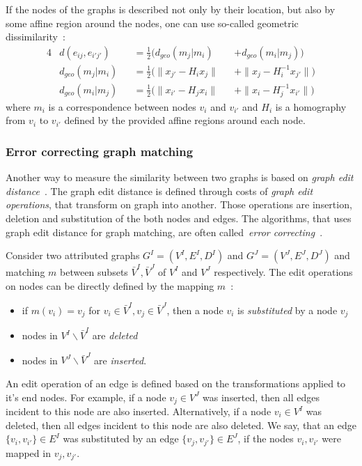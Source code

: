 \begin{itemize}
	If the nodes of the graphs is described not only by their location, but also by some affine region around the nodes, one can use so-called geometric dissimilarity~\cite{Cho2009_AgglClustering,Cho2012_ProgressiveGM}:
	\begin{alignat}{4}\label{eq:geomDiss}
	& d(e_{ij},e_{i'j'}) && =\frac{1}{2}(d_{geo}(m_j|m_i) && +d_{geo}(m_i|m_j)) \\
	& d_{geo}(m_j|m_i) && =\frac{1}{2}(\|x_{j'}-H_{i}x_j\| && + \|x_{j}-H^{-1}_ix_{j'}\|) \\
	& d_{geo}(m_i|m_j) && =\frac{1}{2}(\|x_{i'}-H_{j}x_i\| && + \|x_{i}-H^{-1}_{j}x_{i'}\|) 
	\end{alignat}
	where $m_i$ is a correspondence between nodes $v_i$ and $v_{i'}$ and $H_i$ is a homography from $v_i$ to $v_{i'}$ defined by the provided affine regions around each node.
\end{itemize}
\vspace{-5pt}

\subsubsection{Error correcting graph matching}
Another way to measure the similarity between two graphs is based on \emph{graph edit distance}~\cite{Bunke1983_inexactGM}. The graph edit distance is defined through costs of \emph{graph edit operations}, that transform on graph into another. Those operations are insertion, deletion and substitution of the both nodes and edges. The algorithms, that uses graph edit distance for graph matching, are often called~\emph{error correcting}~\cite{Conte2004}.

Consider two attributed graphs $G^I = (V^I, E^I,D^I)$ and $G^J = (V^J, E^J,D^J)$ and matching $m$ between subsets $\bar{V}^I,\bar{V}^J$ of $V^I$ and $V^J$ respectively. The edit operations on nodes can be directly defined by the mapping $m$~\cite{Bunke1998_ErrTolerantGM}:
\begin{itemize}
	\item if $m(v_i)=v_j$ for $v_i\in\bar{V}^I,v_j\in\bar{V}^J$, then a node $v_i$ is \emph{substituted} by a node $v_j$
	\item nodes in $V^I\backslash\bar{V}^I$ are \emph{deleted}
	\item nodes in $V^J\backslash\bar{V}^J$ are \emph{inserted}.
\end{itemize}
An edit operation of an edge is defined based on the transformations applied to it's end nodes. For example, if a node $v_j\in V^J$ was inserted, then all edges incident to this node are also inserted. Alternatively, if a node $v_i\in V^I$ was deleted, then all edges incident to this node are also deleted. We say, that an edge $\{v_i,v_{i'}\}\in E^I$ was substituted by an edge $\{v_j,v_{j'}\}\in E^J$, if the nodes $v_i,v_{i'}$ were mapped in $v_j,v_{j'}$.

